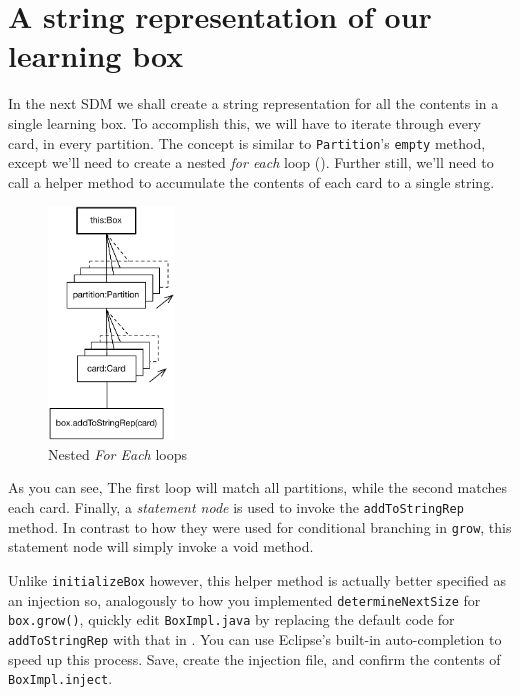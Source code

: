\newpage
\hypertarget{sec:stringRep}{}
\section{A string representation of our learning box}
\label{sec_A string representation of our learning box}
\genHeader

In the next SDM we shall create a string representation for all the contents in a single learning box. To accomplish this, we will have to iterate through 
every card, in every partition. The concept is similar to \texttt{Partition}'s \texttt{empty} method, except we'll need to create a nested \emph{for each}
loop (). Further still, we'll need to call a helper method to accumulate the contents of each card to a single string.

\vspace{1cm}

\begin{figure}[htbp]
	\centering
	\includegraphics[width=0.3\textwidth]{goal_stringRep.pdf}
	\caption{Nested \emph{For Each} loops}
	\label{fig:goal_stringRep}
\end{figure}

\vspace{1cm}

As you can see, The first loop will match all partitions, while the second matches each card. Finally, a \emph{statement node} is used to invoke the
\texttt{addToStringRep} method. In contrast to how they were used for conditional branching in \texttt{grow}, this statement node will simply invoke a
void method.

Unlike \texttt{initializeBox} however, this helper method is actually better specified as an injection so, analogously to how you implemented
\texttt{deter\-mine\-Next\-Size} for \texttt{box.grow()}, quickly edit \texttt{BoxImpl.java} by replacing the default code for \texttt{addToStringRep} with that
in . You can use Eclipse's built-in auto-completion to speed up this process. Save, create the injection file, and
confirm the contents of \texttt{BoxImpl.inject}.

